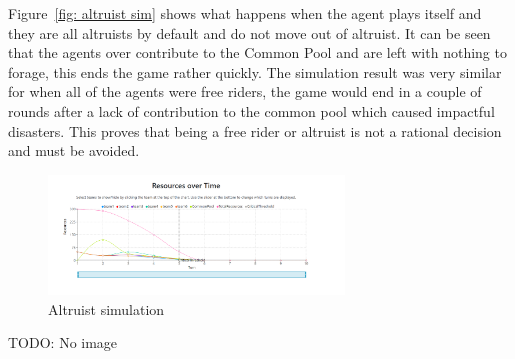 Figure~\ref{fig: altruist sim}  shows what happens when the agent plays itself and they are all altruists by default and do not move out of altruist. It can be seen that the agents over contribute to the Common Pool and are left with nothing to forage, this ends the game rather quickly. The simulation result was very similar for when all of the agents were free riders, the game would end in a couple of rounds after a lack of contribution to the common pool which caused impactful disasters.  This proves that being a free rider or altruist is not a rational decision and must be avoided. 

\begin{figure}[!htb]
    \centering
    \includegraphics[width=0.7\textwidth]{10_team2_agentdesign/images/altruist sim.png}
    \caption{Altruist simulation}
    \label{fig:  altruist sim}
\end{figure} TODO: No image